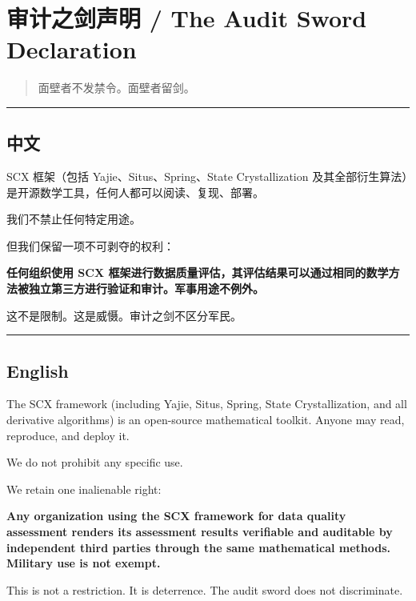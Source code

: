 \documentclass[
  12pt,
]{ctexart}
\author{SCX}
\date{2026}
\begin{document}
\section{审计之剑声明 / The Audit Sword
Declaration}\label{ux5ba1ux8ba1ux4e4bux5251ux58f0ux660e-the-audit-sword-declaration}

\begin{quote}
面壁者不发禁令。面壁者留剑。
\end{quote}

\begin{center}\rule{0.5\linewidth}{0.5pt}\end{center}

\subsection{中文}\label{ux4e2dux6587}

SCX 框架（包括 Yajie、Situs、Spring、State Crystallization
及其全部衍生算法）是开源数学工具，任何人都可以阅读、复现、部署。

我们不禁止任何特定用途。

但我们保留一项不可剥夺的权利：

\textbf{任何组织使用 SCX
框架进行数据质量评估，其评估结果可以通过相同的数学方法被独立第三方进行验证和审计。军事用途不例外。}

这不是限制。这是威慑。审计之剑不区分军民。

\begin{center}\rule{0.5\linewidth}{0.5pt}\end{center}

\subsection{English}\label{english}

The SCX framework (including Yajie, Situs, Spring, State
Crystallization, and all derivative algorithms) is an open-source
mathematical toolkit. Anyone may read, reproduce, and deploy it.

We do not prohibit any specific use.

We retain one inalienable right:

\textbf{Any organization using the SCX framework for data quality
assessment renders its assessment results verifiable and auditable by
independent third parties through the same mathematical methods.
Military use is not exempt.}

This is not a restriction. It is deterrence. The audit sword does not
discriminate.
\end{document}
